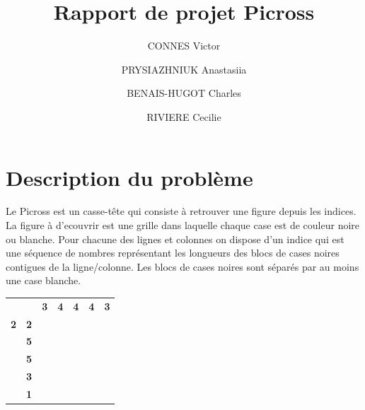 \documentclass{article}
\begin{document}
\title{Rapport de projet Picross}
\author{CONNES Victor \and PRYSIAZHNIUK Anastasiia \and BENAIS-HUGOT Charles \and RIVIERE Cecilie}
\maketitle
\tableofcontents 
\newpage
\section{Description du probl\`eme}

Le Picross est un casse-t\^ete qui consiste \`a retrouver une figure depuis les indices. La figure \`a d'ecouvrir est une grille dans laquelle chaque case est de couleur noire ou blanche. Pour chacune des lignes et colonnes on dispose d'un indice qui est une s\'equence de nombres repr\'esentant les longueurs des blocs de cases noires contigues de la ligne/colonne. Les blocs de cases noires sont s\'epar\'es par au moins une case blanche.

\begin{table}[h]
\centering
\begin{tabular}{ccccccc}
\textbf{}  & \textbf{}                       & \textbf{3}                     & \textbf{4}                     & \textbf{4}                     & \textbf{4}                     & \textbf{3}                     \\ \cline{3-7} 
\textbf{2} & \multicolumn{1}{c|}{\textbf{2}} & \multicolumn{1}{c|}{\textbf{}} & \multicolumn{1}{c|}{\textbf{}} & \multicolumn{1}{c|}{\textbf{}} & \multicolumn{1}{c|}{\textbf{}} & \multicolumn{1}{c|}{\textbf{}} \\ \cline{3-7} 
\textbf{}  & \multicolumn{1}{c|}{\textbf{5}} & \multicolumn{1}{c|}{\textbf{}} & \multicolumn{1}{c|}{\textbf{}} & \multicolumn{1}{c|}{\textbf{}} & \multicolumn{1}{c|}{\textbf{}} & \multicolumn{1}{c|}{\textbf{}} \\ \cline{3-7} 
\textbf{}  & \multicolumn{1}{c|}{\textbf{5}} & \multicolumn{1}{c|}{\textbf{}} & \multicolumn{1}{c|}{\textbf{}} & \multicolumn{1}{c|}{\textbf{}} & \multicolumn{1}{c|}{\textbf{}} & \multicolumn{1}{c|}{\textbf{}} \\ \cline{3-7} 
\textbf{}  & \multicolumn{1}{c|}{\textbf{3}} & \multicolumn{1}{c|}{\textbf{}} & \multicolumn{1}{c|}{\textbf{}} & \multicolumn{1}{c|}{\textbf{}} & \multicolumn{1}{c|}{\textbf{}} & \multicolumn{1}{c|}{\textbf{}} \\ \cline{3-7} 
\textbf{}  & \multicolumn{1}{c|}{\textbf{1}} & \multicolumn{1}{c|}{\textbf{}} & \multicolumn{1}{c|}{\textbf{}} & \multicolumn{1}{c|}{\textbf{}} & \multicolumn{1}{c|}{\textbf{}} & \multicolumn{1}{c|}{\textbf{}} \\ \cline{3-7} 
\end{tabular}
\end{table}
\end{document}
